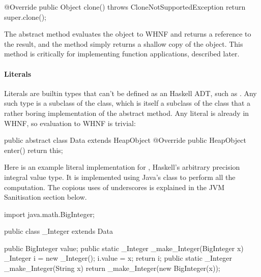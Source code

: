 \documentclass[dissertation.tex]{subfiles}
\begin{document}
{{{\begin{javafigure}
{                @Override
                public Object clone() throws CloneNotSupportedException {
                    return super.clone();
                }
            }
            \end{javafigure}

            The abstract  method evaluates the object to WHNF and returns a reference to the result, and the
             method simply returns a shallow copy of the object. This method is critically for implementing
            function applications, described later.

            \paragraph*{Literals}\label{sec:literals}
            {
                
                Literals are builtin types that can't be defined as an Haskell ADT, such as . Any such type
                is a subclass of the  class, which is itself a subclass of the  class that a
                rather boring implementation of the abstract  method. Any literal is already in WHNF, so
                evaluation to WHNF is trivial:

                \begin{javafigure}
                public abstract class Data extends HeapObject {
                    @Override
                    public HeapObject enter() {
                        return this;
                    }
                }
                \end{javafigure}

                Here is an example literal implementation for , Haskell's arbitrary precision integral
                value type. It is implemented using Java's  class to perform all the computation. The
                copious uses of underscores is explained in the JVM Sanitisation section below.

                \begin{javafigure}
                import java.math.BigInteger;

                public class _Integer extends Data {
                    public BigInteger value;
                    public static _Integer _make_Integer(BigInteger x) {
                        _Integer i = new _Integer();
                        i.value = x;
                        return i;
                    }
                    public static _Integer _make_Integer(String x) {
                        return _make_Integer(new BigInteger(x));
                    }

}
\end{javafigure}}}}}
\end{document}
